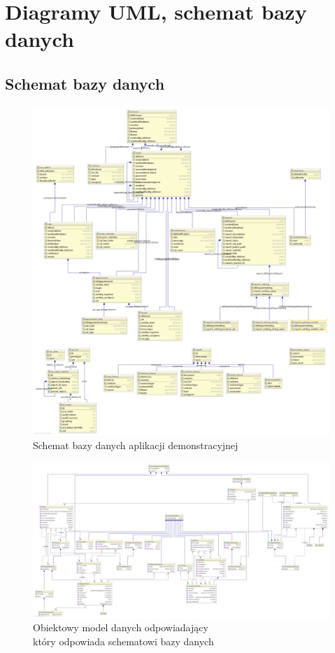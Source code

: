 \section{Diagramy UML, schemat bazy danych}
	\subsection{Schemat bazy danych}
	\begin{figure}[H]
		\centering
		\includegraphics[width=1.1\textwidth]{images/db_UML}
		\caption[Schemat bazy danych aplikacji demonstracyjnej]{
			Schemat bazy danych aplikacji demonstracyjnej
		}
		\label{app:schema_db}
	\end{figure}
	\begin{figure}[H]
		\centering
		\includegraphics[angle=90,height=\textheight]{images/springatom_model_uml}
		\caption[Obiektowy model danych]{
			Obiektowy model danych odpowiadający\\który odpowiada schematowi bazy danych
		}
		\label{app:schema_org_agatom_springatom_model}
	\end{figure}
